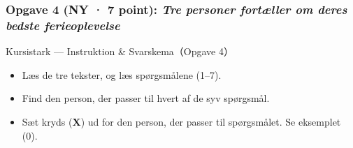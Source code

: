 \subsubsection*{Opgave 4 (NY · 7 point): \textit{Tre personer fortæller om deres bedste ferieoplevelse}}

\begin{emailbox}{Kursistark --- Instruktion \& Svarskema（Opgave 4）}
\begin{itemize}
  \item Læs de tre tekster, og læs spørgsmålene (1--7).
  \item Find den person, der passer til hvert af de syv spørgsmål.
  \item Sæt kryds (\textbf{X}) ud for den person, der passer til spørgsmålet. Se eksemplet (0).
\end{itemize}


\end{emailbox}
